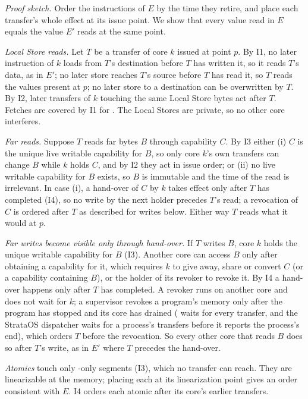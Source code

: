 \textit{Proof sketch.} Order the instructions of $E$ by the time they retire, and place each
transfer's whole effect at its issue point. We show that every value read in $E$ equals the value
$E'$ reads at the same point.

\emph{Local Store reads.} Let $T$ be a transfer of core $k$ issued at point $p$. By I1, no later
instruction of $k$ loads from $T$'s  destination before $T$ has written it, so it reads $T$'s
data, as in $E'$; no later store reaches $T$'s  source before $T$ has read it, so $T$ reads
the values present at $p$; no later store to a  destination can be overwritten by $T$. By I2,
later transfers of $k$ touching the same Local Store bytes act after $T$. Fetches are covered by I1 for
. The Local Stores are private, so no other core interferes.

\emph{Far reads.} Suppose $T$ reads far bytes $B$ through capability $C$. By I3 either (i) $C$ is the
unique live writable capability for $B$, so only core $k$'s own transfers can change $B$ while $k$ holds
$C$, and by I2 they act in issue order; or (ii) no live writable capability for $B$ exists, so $B$ is
immutable and the time of the read is irrelevant. In case (i), a hand-over of $C$ by $k$ takes effect only
after $T$ has completed (I4), so no write by the next holder precedes $T$'s read; a revocation of $C$ is ordered after $T$ as described for writes below. Either way $T$ reads what it
would at $p$.

\emph{Far writes become visible only through hand-over.} If $T$ writes $B$, core $k$ holds the unique
writable capability for $B$ (I3). Another core can access $B$ only after obtaining a capability for it,
which requires $k$ to give away, share or convert $C$ (or a capability containing $B$), or the holder of
its revoker to revoke it. By I4 a hand-over happens only after $T$ has completed. A revoker runs on another
core and does not wait for $k$; a supervisor revokes a program's memory only after the program has
stopped and its core has drained ( waits for every transfer, and the StrataOS dispatcher
waits for a process's transfers before it reports the process's end), which orders $T$ before the
revocation. So every other core that reads $B$ does so after $T$'s write, as
in $E'$ where $T$ precedes the hand-over.

\emph{Atomics} touch only -only segments (I3), which no transfer can reach. They are linearizable
at the memory; placing each at its linearization point gives an order consistent with $E$. I4 orders
each atomic after its core's earlier transfers.

